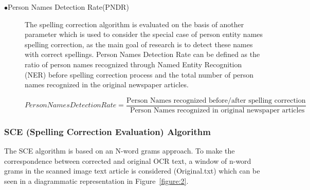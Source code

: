 \documentclass[12pt]{article}
\begin{document}
\begin{description}
\item[$\bullet$Person Names Detection Rate(PNDR)]

The spelling correction algorithm is evaluated on the basis of another parameter which is used to consider the special case of person entity names spelling correction, as the main goal of research is to detect these names with correct spellings.
Person Names Detection Rate can be defined as the ratio of person names recognized through Named Entity Recognition (NER) before spelling correction process and the total number of person names recognized in the original newspaper articles.

$$Person Names Detection Rate=\dfrac{ \text{Person Names recognized before/after spelling correction}} {\text{ Person Names recognized in original newspaper articles}} $$

\end{description}

\subsubsection{SCE (Spelling Correction Evaluation) Algorithm}

The SCE algorithm is based on an N-word grams approach. To make the correspondence between corrected and original OCR text, a window of n-word grams in the scanned image text article is considered (Original.txt) which can be seen in a diagrammatic representation in Figure~\ref{figure:2}.
\end{document}
